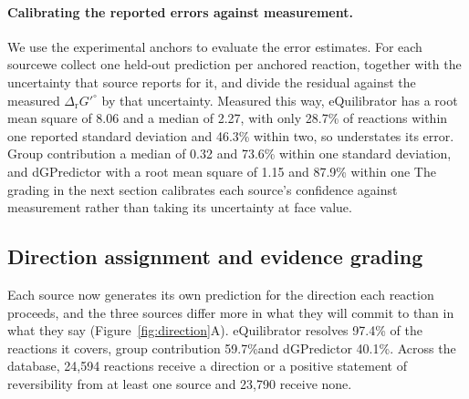 \documentclass[unnumsec,webpdf,modern,large]{oup-authoring-template}
\newcommand{\drGo}{$\Delta_{\mathrm{r}}G'^{\circ}$} %
\providecommand{\DIFadd}[1]{{\protect\color{red}{#1}}} %
\providecommand{\DIFaddbegin}{} %
\providecommand{\DIFaddend}{} %
\begin{document}
\paragraph{Calibrating the reported errors against measurement.} We use the experimental anchors to evaluate the error estimates.
For each source\DIFaddbegin \DIFadd{, }\DIFaddend we collect one held-out prediction per anchored reaction, together with the uncertainty that source reports for it, and divide the residual against the measured \drGo{} by that uncertainty.
Measured this way, eQuilibrator has a root mean square of 8.06 and a median of 2.27, with only 28.7\% of reactions within one reported standard deviation and 46.3\% within two, so  \DIFaddbegin \DIFadd{eQuilibrator }\DIFaddend understates its error.
Group contribution \DIFaddbegin \DIFadd{, by contrast, has }\DIFaddend a median of 0.32 and 73.6\% within one standard deviation, and dGPredictor  \DIFaddbegin \DIFadd{performs even better }\DIFaddend with a root mean square of 1.15 and 87.9\% within one  \DIFaddbegin \DIFadd{standard deviation.
}\DIFaddend The grading in the next section calibrates each source's confidence against measurement rather than taking its uncertainty at face value.

 \subsection{Direction assignment and evidence grading}\label{sec:results-direction}

Each source now generates its own prediction for the direction each reaction proceeds, and the three sources differ more in what they will commit to than in what they say (Figure~\ref{fig:direction}A).
eQuilibrator resolves 97.4\% of the reactions it covers, group contribution 59.7\%\DIFaddbegin \DIFadd{, }\DIFaddend and dGPredictor 40.1\%.
Across the database, 24,594 reactions receive a direction or a positive statement of reversibility from at least one source and 23,790 receive none.
\end{document}
